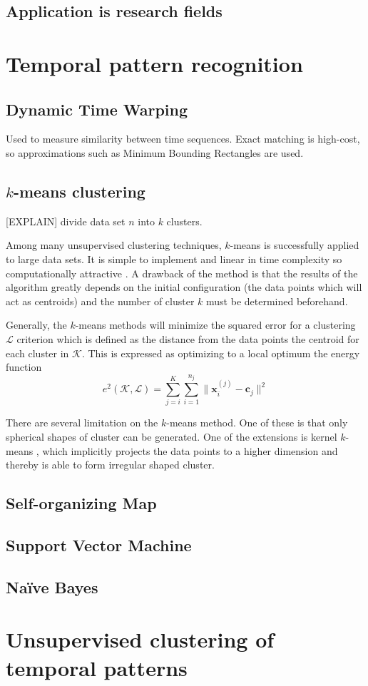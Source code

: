 
\subsection{Application is research fields}



\section{Temporal pattern recognition}

\subsection{Dynamic Time Warping}
Used to measure similarity between time sequences. Exact matching is 
high-cost, so approximations such as Minimum Bounding Rectangles are used.

\subsection{$k$-means clustering}
[EXPLAIN] divide data set $n$ into $k$ clusters.

Among many unsupervised clustering techniques, $k$-means is successfully 
applied to large data sets. It is simple to implement and linear in time 
complexity so computationally attractive \cite{jain1999data}. A drawback of 
the method is that the results of the algorithm greatly depends on the initial 
configuration (the data points which will act as centroids) and the number of 
cluster $k$ must be determined beforehand.

Generally, the $k$-means methods will minimize the squared error for a 
clustering $\mathcal{L}$ criterion which is defined as the distance from the 
data points the centroid for each cluster in $\mathcal{K}$. This is expressed 
as optimizing to a local optimum the energy function
\begin{equation} \label{eq:k-means energy}
e^2(\mathcal{K},\mathcal{L}) = 
\sum_{j=i}^{K}\sum_{i=1}^{n_j}\|\mathbf{x}_i^{(j)} - 
\mathbf{c}_j\|^2
\end{equation}

There are several limitation on the $k$-means method. One of these is that 
only spherical shapes of cluster can be generated. One of the extensions is 
kernel $k$-means \cite{scholkopf1998nonlinear}, which implicitly projects the 
data points to a higher dimension and thereby is able to form irregular shaped 
cluster.

\subsection{Self-organizing Map}

\subsection{Support Vector Machine}

\subsection{Na\"{i}ve Bayes}

\section{Unsupervised clustering of temporal patterns}
